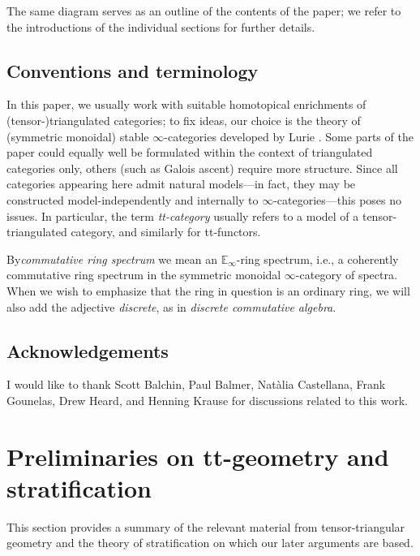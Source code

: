 \documentclass{amsart}%
\numberwithin{equation}{section}%
\theoremstyle{remark}
\begin{document}
The same diagram serves as an outline of the contents of the paper; we refer to the introductions of the individual sections for further details.

\subsection{Conventions and terminology}

In this paper, we usually work with suitable homotopical enrichments of (tensor-)triangulated categories; to fix ideas, our choice is the theory of (symmetric monoidal) stable $\infty$-categories developed by Lurie \cite{HTTLurie,HALurie}. Some parts of the paper could equally well be formulated within the context of triangulated categories only, others (such as Galois ascent) require more structure. Since all categories appearing here admit natural models---in fact, they may be constructed model-independently and internally to $\infty$-categories---this poses no issues. %
In particular, the term \emph{tt-category} usually refers to a model of a tensor-triangulated category, and similarly for tt-functors.

By\emph{commutative ring spectrum} we mean an $\mathbb{E}_{\infty}$-ring spectrum, i.e., a coherently commutative ring spectrum in the symmetric monoidal $\infty$-category of spectra. When we wish to emphasize that the ring in question is an ordinary ring, we will also add the adjective \emph{discrete}, as in \emph{discrete commutative algebra}. 

\subsection*{Acknowledgements}

I would like to thank Scott Balchin, Paul Balmer, Nat\`alia Castellana, Frank Gounelas, Drew Heard, and Henning Krause for discussions related to this work. %



\section{Preliminaries on tt-geometry and stratification}\label{sec:ttgeometry}

This section provides a summary of the relevant material from tensor-triangular geometry and the theory of stratification on which our later arguments are based. 
\end{document}
